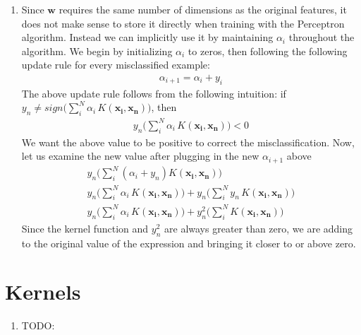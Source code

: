 \documentclass[12pt]{article}
\begin{document}
\begin{enumerate}[label=\alph*.]
	\item Since $\mathbf{w}$ requires the same number of dimensions as the original features, it does not make sense to store it directly when training with the Perceptron algorithm. Instead we can implicitly use it by maintaining $\alpha_i$ throughout the algorithm. We begin by initializing $\alpha_i$ to zeros, then following the following update rule for every misclassified example:
	\begin{gather*}
		\alpha_{i+1} = \alpha_i + y_i
	\end{gather*}
	The above update rule follows from the following intuition: if $y_n \neq sign \bigg( \sum^N_{i}{\alpha_i \, K( \mathbf{x_i}, \mathbf{x_n} )} \bigg) $,  then 
	\begin{gather*}
		y_n \bigg( \sum^N_{i}{\alpha_i \, K( \mathbf{x_i}, \mathbf{x_n} )} \bigg) < 0
	\end{gather*}
	We want the above value to be positive to correct the misclassification. Now, let us examine the new value after plugging in the new $\alpha_{i+1}$ above
	\begin{gather*}
		y_n \bigg( \sum^N_{i}{(\alpha_i + y_n) K( \mathbf{x_i}, \mathbf{x_n} )} \bigg) \\ 
		y_n \bigg( \sum^N_{i}{\alpha_i \, K( \mathbf{x_i}, \mathbf{x_n} )} \bigg) + y_n \bigg( \sum^N_{i}{y_n \, K( \mathbf{x_i}, \mathbf{x_n} )} \bigg) \\
		y_n \bigg( \sum^N_{i}{\alpha_i \, K( \mathbf{x_i}, \mathbf{x_n} )} \bigg) + y_n^2 \bigg( \sum^N_{i}{ K( \mathbf{x_i}, \mathbf{x_n} )} \bigg)
	\end{gather*}
	Since the kernel function and $y_n^2$ are always greater than zero, we are adding to the original value of the expression and bringing it closer to or above zero.
\end{enumerate}

\section{Kernels}
\begin{enumerate}[label=\alph*.]
	\item TODO:
\end{enumerate}
\end{document}
